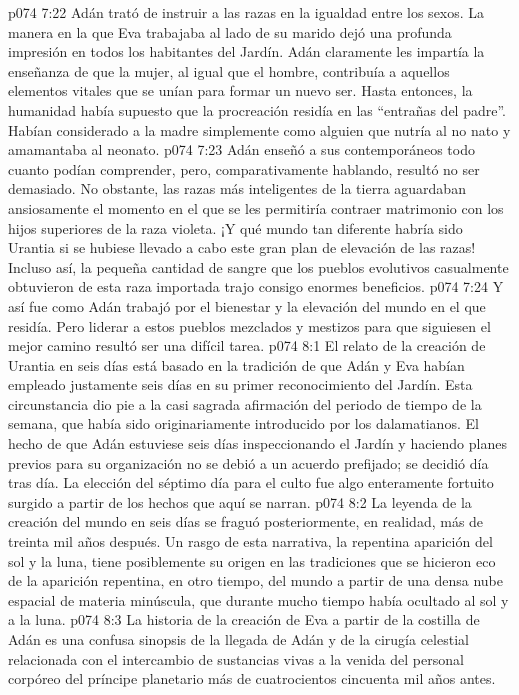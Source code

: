 \vs p074 7:22 \pc Adán trató de instruir a las razas en la igualdad entre los sexos. La manera en la que Eva trabajaba al lado de su marido dejó una profunda impresión en todos los habitantes del Jardín. Adán claramente les impartía la enseñanza de que la mujer, al igual que el hombre, contribuía a aquellos elementos vitales que se unían para formar un nuevo ser. Hasta entonces, la humanidad había supuesto que la procreación residía en las “entrañas del padre”. Habían considerado a la madre simplemente como alguien que nutría al no nato y amamantaba al neonato.
\vs p074 7:23 Adán enseñó a sus contemporáneos todo cuanto podían comprender, pero, comparativamente hablando, resultó no ser demasiado. No obstante, las razas más inteligentes de la tierra aguardaban ansiosamente el momento en el que se les permitiría contraer matrimonio con los hijos superiores de la raza violeta. ¡Y qué mundo tan diferente habría sido Urantia si se hubiese llevado a cabo este gran plan de elevación de las razas! Incluso así, la pequeña cantidad de sangre que los pueblos evolutivos casualmente obtuvieron de esta raza importada trajo consigo enormes beneficios.
\vs p074 7:24 Y así fue como Adán trabajó por el bienestar y la elevación del mundo en el que residía. Pero liderar a estos pueblos mezclados y mestizos para que siguiesen el mejor camino resultó ser una difícil tarea.
\vs p074 8:1 El relato de la creación de Urantia en seis días está basado en la tradición de que Adán y Eva habían empleado justamente seis días en su primer reconocimiento del Jardín. Esta circunstancia dio pie a la casi sagrada afirmación del periodo de tiempo de la semana, que había sido originariamente introducido por los dalamatianos. El hecho de que Adán estuviese seis días inspeccionando el Jardín y haciendo planes previos para su organización no se debió a un acuerdo prefijado; se decidió día tras día. La elección del séptimo día para el culto fue algo enteramente fortuito surgido a partir de los hechos que aquí se narran.
\vs p074 8:2 La leyenda de la creación del mundo en seis días se fraguó posteriormente, en realidad, más de treinta mil años después. Un rasgo de esta narrativa, la repentina aparición del sol y la luna, tiene posiblemente su origen en las tradiciones que se hicieron eco de la aparición repentina, en otro tiempo, del mundo a partir de una densa nube espacial de materia minúscula, que durante mucho tiempo había ocultado al sol y a la luna.
\vs p074 8:3 La historia de la creación de Eva a partir de la costilla de Adán es una confusa sinopsis de la llegada de Adán y de la cirugía celestial relacionada con el intercambio de sustancias vivas a la venida del personal corpóreo del príncipe planetario más de cuatrocientos cincuenta mil años antes.

